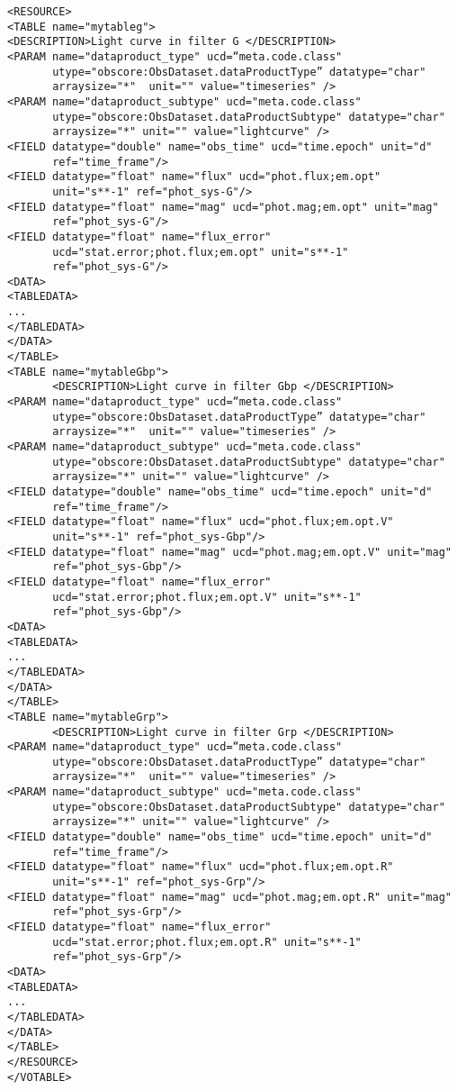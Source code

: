 \begingroup\footnotesize
\begin{tcolorbox}
\begin{verbatim}
<RESOURCE>
<TABLE name="mytableg">
<DESCRIPTION>Light curve in filter G </DESCRIPTION>
<PARAM name="dataproduct_type" ucd=“meta.code.class" 
       utype="obscore:ObsDataset.dataProductType” datatype="char" 
       arraysize="*"  unit="" value="timeseries" />
<PARAM name="dataproduct_subtype" ucd="meta.code.class" 
       utype="obscore:ObsDataset.dataProductSubtype" datatype="char" 
       arraysize="*" unit="" value="lightcurve" />
<FIELD datatype="double" name="obs_time" ucd="time.epoch" unit="d" 
       ref="time_frame"/>
<FIELD datatype="float" name="flux" ucd="phot.flux;em.opt" 
       unit="s**-1" ref="phot_sys-G"/>
<FIELD datatype="float" name="mag" ucd="phot.mag;em.opt" unit="mag"
       ref="phot_sys-G"/>
<FIELD datatype="float" name="flux_error" 
       ucd="stat.error;phot.flux;em.opt" unit="s**-1"
       ref="phot_sys-G"/>
<DATA>
<TABLEDATA>
...
</TABLEDATA>
</DATA>
</TABLE>
<TABLE name="mytableGbp">
       <DESCRIPTION>Light curve in filter Gbp </DESCRIPTION>
<PARAM name="dataproduct_type" ucd=“meta.code.class" 
       utype="obscore:ObsDataset.dataProductType” datatype="char" 
       arraysize="*"  unit="" value="timeseries" />
<PARAM name="dataproduct_subtype" ucd="meta.code.class" 
       utype="obscore:ObsDataset.dataProductSubtype" datatype="char" 
       arraysize="*" unit="" value="lightcurve" />
<FIELD datatype="double" name="obs_time" ucd="time.epoch" unit="d" 
       ref="time_frame"/>
<FIELD datatype="float" name="flux" ucd="phot.flux;em.opt.V" 
       unit="s**-1" ref="phot_sys-Gbp"/>
<FIELD datatype="float" name="mag" ucd="phot.mag;em.opt.V" unit="mag"
       ref="phot_sys-Gbp"/>
<FIELD datatype="float" name="flux_error" 
       ucd="stat.error;phot.flux;em.opt.V" unit="s**-1"
       ref="phot_sys-Gbp"/>
<DATA>
<TABLEDATA>
...
</TABLEDATA>
</DATA>
</TABLE>
<TABLE name="mytableGrp">
       <DESCRIPTION>Light curve in filter Grp </DESCRIPTION>
<PARAM name="dataproduct_type" ucd=“meta.code.class" 
       utype="obscore:ObsDataset.dataProductType” datatype="char" 
       arraysize="*"  unit="" value="timeseries" />
<PARAM name="dataproduct_subtype" ucd="meta.code.class" 
       utype="obscore:ObsDataset.dataProductSubtype" datatype="char" 
       arraysize="*" unit="" value="lightcurve" />
<FIELD datatype="double" name="obs_time" ucd="time.epoch" unit="d" 
       ref="time_frame"/>
<FIELD datatype="float" name="flux" ucd="phot.flux;em.opt.R" 
       unit="s**-1" ref="phot_sys-Grp"/>
<FIELD datatype="float" name="mag" ucd="phot.mag;em.opt.R" unit="mag"
       ref="phot_sys-Grp"/>
<FIELD datatype="float" name="flux_error" 
       ucd="stat.error;phot.flux;em.opt.R" unit="s**-1"
       ref="phot_sys-Grp"/>
<DATA>
<TABLEDATA>
...
</TABLEDATA>
</DATA>
</TABLE>
</RESOURCE>
</VOTABLE>
\end{verbatim}
\end{tcolorbox}
\endgroup
